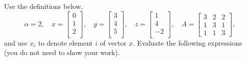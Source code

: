 \documentclass{article}
\newcommand{\blu}[1]{{\textcolor{blu}{#1}}}
\let\ask\blu
\begin{document}
  Use the definitions below,
  \[
  \alpha = 2,\quad
  x = \left[\begin{array}{c}
  0\\
  1\\
  2\\
  \end{array}\right], \quad
  y = \left[\begin{array}{c}
  3\\
  4\\
  5\\
  \end{array}\right],\quad
  z = \left[\begin{array}{c}
  1\\
  4\\
  -2\\
  \end{array}\right],\quad
  A = \left[\begin{array}{ccc}
  3 & 2 & 2\\
  1 & 3 & 1\\
  1 & 1 & 3
  \end{array}\right],
  \]
  and use $x_i$ to denote element $i$ of vector $x$.
  \ask{Evaluate the following expressions} (you do not need to show your work).
\end{document}
